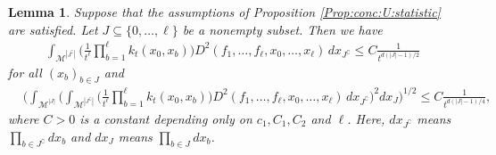 \documentclass[10pt]{article}
\theoremstyle{plain}
\newtheorem{lemma}{Lemma}
\theoremstyle{definition}
\theoremstyle{remark}
\begin{document}
\begin{lemma}\label{lemma:bounds:apply:U:concentation}
    Suppose that the assumptions of Proposition \ref{Prop:conc:U:statistic} are satisfied. Let $J\subseteq \{0,\dots,\ell\}$ be a nonempty subset. Then we have
    \begin{align}\label{eq:bounds:apply:U:concentation:1}
    \int_{\mathcal{M}^{|J^\complement|}}\Big(\frac{1}{t^\ell}\prod_{b=1}^\ell k_t(x_0,x_b)\Big) D^2(f_1,\dots,f_\ell,x_0,\dots,x_\ell)\, dx_{J^\complement}\leq C\frac{1}{t^{d(|J|-1)/2}}    
    \end{align}
    for all $(x_b)_{b\in J}$ and
    \begin{align}\label{eq:bounds:apply:U:concentation:2}
    &\Big(\int_{\mathcal{M}^{|J|}}\Big(\int_{\mathcal{M}^{|J^\complement|}}\Big(\frac{1}{t^\ell}\prod_{b=1}^\ell k_t(x_0,x_b)\Big) D^2(f_1,\dots,f_\ell,x_0,\dots,x_\ell)\, dx_{J^\complement}\Big)^2dx_J\Big)^{1/2}\leq C\frac{1}{t^{d(|J|-1)/4}},
    \end{align}
    where $C>0$ is a constant depending only on $c_1,C_1,C_2$ and $\ell$. Here, $dx_{J^\complement}$ means $\prod_{b\in J^\complement}dx_b$ and $dx_J$ means $\prod_{b\in J}dx_b$.
\end{lemma}
\end{document}
